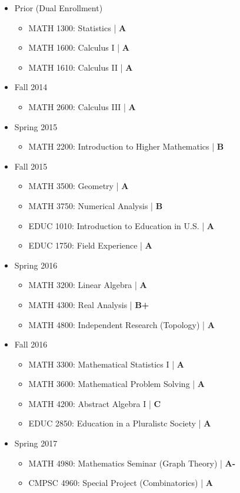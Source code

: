 \documentclass[10pt]{article}
\begin{document}
\begin{itemize}
\item Prior (Dual Enrollment)
\begin{itemize}
\item MATH 1300: Statistics | \textbf{A}
\item MATH 1600: Calculus I | \textbf{A}
\item MATH 1610: Calculus II | \textbf{A}
\end{itemize}
\item Fall 2014
\begin{itemize}
\item MATH 2600: Calculus III | \textbf{A}
\end{itemize}
\item Spring 2015
\begin{itemize}
\item MATH 2200: Introduction to Higher Mathematics | \textbf{B}
\end{itemize}
\item Fall 2015
\begin{itemize}
\item MATH 3500: Geometry | \textbf{A}
\item MATH 3750: Numerical Analysis | \textbf{B}
\item EDUC 1010: Introduction to Education in U.S. | \textbf{A}
\item EDUC 1750: Field Experience | \textbf{A}
\end{itemize}
\item Spring 2016
\begin{itemize}
\item MATH 3200: Linear Algebra | \textbf{A}
\item MATH 4300: Real Analysis | \textbf{B+}
\item MATH 4800: Independent Research (Topology) | \textbf{A}
\end{itemize}
\item Fall 2016
\begin{itemize}
\item MATH 3300: Mathematical Statistics I | \textbf{A}
\item MATH 3600: Mathematical Problem Solving | \textbf{A}
\item MATH 4200: Abstract Algebra I | \textbf{C}
\item EDUC 2850: Education in a Pluralistc Society | \textbf{A}
\end{itemize}
\item Spring 2017
\begin{itemize}
\item MATH 4980: Mathematics Seminar (Graph Theory) | \textbf{A-}
\item CMPSC 4960: Special Project (Combinatorics) | \textbf{A}
\end{itemize}
\end{itemize}
\end{document}
